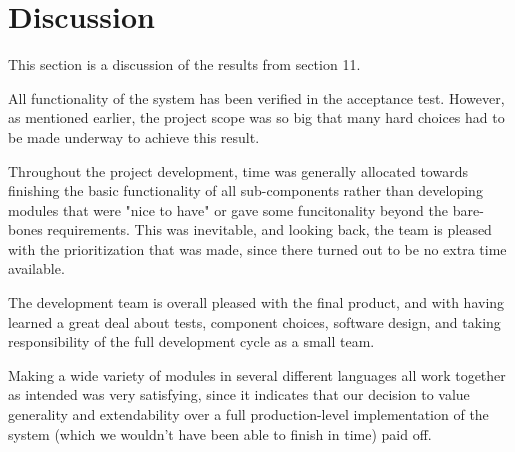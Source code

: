 \chapter{Discussion}
This section is a discussion of the results from section 11. 

All functionality of the system has been verified in the acceptance test. However, as mentioned earlier, the project scope was so big that many hard choices had to be made underway to achieve this result.

Throughout the project development, time was generally allocated towards finishing the basic functionality of all sub-components rather than developing modules that were "nice to have" or gave some funcitonality beyond the bare-bones requirements. This was inevitable, and looking back, the team is pleased with the prioritization that was made, since there turned out to be no extra time available.

The development team is overall pleased with the final product, and with having learned a great deal about tests, component choices, software design, and taking responsibility of the full development cycle as a small team. 

Making a wide variety of modules in several different languages all work together as intended was very satisfying, since it indicates that our decision to value generality and extendability over a full production-level implementation of the system (which we wouldn't have been able to finish in time) paid off.